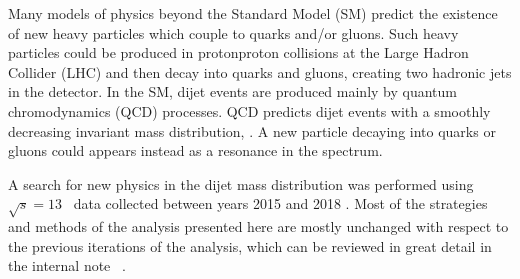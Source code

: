 Many models of physics beyond the Standard Model (SM) predict the
existence of new heavy particles which couple to quarks and/or
gluons. 
Such heavy particles could be produced in proton\text{--}proton
collisions at the Large Hadron Collider (LHC) and then decay into
quarks and gluons, creating two hadronic jets in the detector. 
In the SM, dijet events are produced mainly by quantum chromodynamics
(QCD) processes. 
QCD predicts dijet events with a smoothly decreasing invariant mass
distribution, \mjj. 
A new particle decaying into quarks or gluons could appears instead as
a resonance in the \mjj spectrum.  

A search for new physics in the dijet mass distribution was performed
using $\sqrt{s} = 13$~\TeV\xspace data collected between years 2015 and
2018 \cite{Aad:2019hjw}. 
Most of the strategies and methods of the analysis presented here are
mostly unchanged with respect to the previous iterations of the
analysis, which can be reviewed in great detail in the internal note
~\cite{Nishu:2646455}. 





